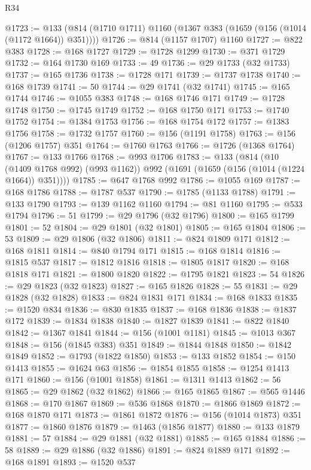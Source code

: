\begin{lexlean}{R34}
\begin{coremodule}
@1723 := @133 (@814 (@1710 @1711) @1160 (@1367 @383 (@1659 (@156 (@1014 (@1172 @1664)) @351))))
@1726 := @814 (@1157 @1707) @1160
@1727 := @822 @383
@1728 := @168 @1727
@1729 := @1728 @1299
@1730 := @371 @1729
@1732 := @164 @1730 @169
@1733 := 49
@1736 := @29 @1733 (@32 @1733)
@1737 := @165 @1736
@1738 := @1728 @171
@1739 := @1737 @1738
@1740 := @168 @1739
@1741 := 50
@1744 := @29 @1741 (@32 @1741)
@1745 := @165 @1744
@1746 := @1055 @383
@1748 := @168 @1746 @171
@1749 := @1728 @1748
@1750 := @1745 @1749
@1752 := @168 @1750 @171
@1753 := @1740 @1752
@1754 := @1384 @1753
@1756 := @168 @1754 @172
@1757 := @1383 @1756
@1758 := @1732 @1757
@1760 := @156 (@1191 @1758)
@1763 := @156 (@1206 @1757) @351
@1764 := @1760 @1763
@1766 := @1726 (@1368 @1764)
@1767 := @133 @1766
@1768 := @993 @1706
@1783 := @133
    (@814
      (@10 (@1409 @1768 @992) (@993 @1162))
      @992
      (@1691 (@1659 (@156 (@1014 (@1224 @1664)) @351))))
@1785 := @647 @1768 @992
@1786 := @1055 @169
@1787 := @168 @1786
@1788 := @1787 @537
@1790 := @1785 (@1133 @1788)
@1791 := @133 @1790
@1793 := @139 @1162 @1160
@1794 := @81 @1160
@1795 := @533 @1794
@1796 := 51
@1799 := @29 @1796 (@32 @1796)
@1800 := @165 @1799
@1801 := 52
@1804 := @29 @1801 (@32 @1801)
@1805 := @165 @1804
@1806 := 53
@1809 := @29 @1806 (@32 @1806)
@1811 := @824 @1809 @171
@1812 := @168 @1811
@1814 := @840 @1794 @171
@1815 := @168 @1814
@1816 := @1815 @537
@1817 := @1812 @1816
@1818 := @1805 @1817
@1820 := @168 @1818 @171
@1821 := @1800 @1820
@1822 := @1795 @1821
@1823 := 54
@1826 := @29 @1823 (@32 @1823)
@1827 := @165 @1826
@1828 := 55
@1831 := @29 @1828 (@32 @1828)
@1833 := @824 @1831 @171
@1834 := @168 @1833
@1835 := @1520 @834
@1836 := @830 @1835
@1837 := @168 @1836
@1838 := @1837 @172
@1839 := @1834 @1838
@1840 := @1827 @1839
@1841 := @822 @1840
@1842 := @1367 @1841
@1844 := @156 (@1001 @1181)
@1845 := @1013 @367
@1848 := @156 (@1845 @383) @351
@1849 := @1844 @1848
@1850 := @1842 @1849
@1852 := @1793 (@1822 @1850)
@1853 := @133 @1852
@1854 := @150 @1413
@1855 := @1624 @63
@1856 := @1854 @1855
@1858 := @1254 @1413 @171
@1860 := @156 (@1001 @1858)
@1861 := @1311 @1413
@1862 := 56
@1865 := @29 @1862 (@32 @1862)
@1866 := @165 @1865
@1867 := @565 @1446
@1868 := @170 @1867
@1869 := @536 @1868
@1870 := @1866 @1869
@1872 := @168 @1870 @171
@1873 := @1861 @1872
@1876 := @156 (@1014 @1873) @351
@1877 := @1860 @1876
@1879 := @1463 (@1856 @1877)
@1880 := @133 @1879
@1881 := 57
@1884 := @29 @1881 (@32 @1881)
@1885 := @165 @1884
@1886 := 58
@1889 := @29 @1886 (@32 @1886)
@1891 := @824 @1889 @171
@1892 := @168 @1891
@1893 := @1520 @537

\end{coremodule}
\end{lexlean}

